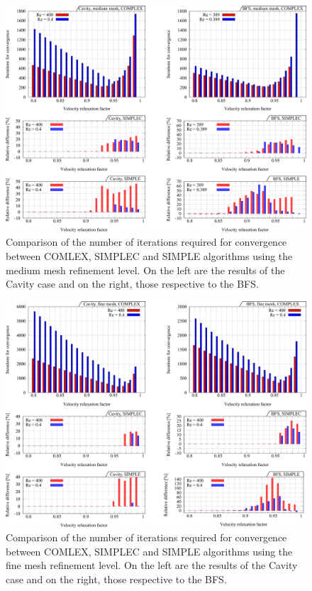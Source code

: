 \documentclass[final,3p,times,11pt,onecolumn]{myElsarticle}
\numberwithin{equation}{section}
\begin{document}
\begin{figure}[t!]
\centering
\includegraphics[width=17cm]{fig/Results/complexMedium.pdf}
\caption{Comparison of the number of iterations required for convergence between COMLEX, SIMPLEC and SIMPLE algorithms using the medium mesh refinement level. On the left are the results of the Cavity case and on the right, those respective to the BFS.}
\label{Fig:complexMedium}
\end{figure}

\begin{figure}[t!]
\centering
\includegraphics[width=17cm]{fig/Results/complexFine.pdf}
\caption{Comparison of the number of iterations required for convergence between COMLEX, SIMPLEC and SIMPLE algorithms using the fine mesh refinement level. On the left are the results of the Cavity case and on the right, those respective to the BFS.}
\label{Fig:complexFine}
\end{figure}
\end{document}
